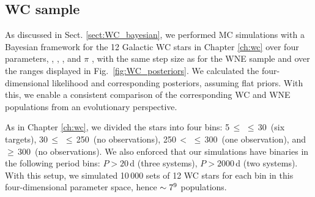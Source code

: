 \subsection{WC sample}
As discussed in Sect. \ref{sect:WC_bayesian}, we performed MC simulations with a Bayesian framework for the 12 Galactic WC stars in Chapter \ref{ch:wc} over four parameters, \logPmin{}, \logPmax{}, \fintWNE{} , and $\pi$ , with the same step size as for the WNE sample and over the ranges displayed in Fig.~\ref{fig:WC_posteriors}. We calculated the four-dimensional likelihood and corresponding posteriors, assuming flat priors. With this, we enable a consistent comparison of the corresponding WC and WNE populations from an evolutionary perspective.

As in Chapter \ref{ch:wc}, we divided the stars into four \DelRV{} bins: 5\,$\le$\,\DelRV{}\,$\le$\,30\,\kms{} (six targets), 30\,$\le$\,\DelRV{}\,$\le$\,250\,\kms{} (no observations), 250\,$<$\,\DelRV{}\,$\le$\,300\,\kms{} (one observation), and  \DelRV{}\,$\ge$\,300\,\kms{} (no observations). We also enforced that our simulations have binaries in the following period bins: $P > 20$\,d (three systems), $P > 2000$\,d (two systems). With this setup, we simulated 10\,000 sets of 12 WC stars for each bin in this four-dimensional parameter space, hence $\sim 7\time10^9$ populations. 
